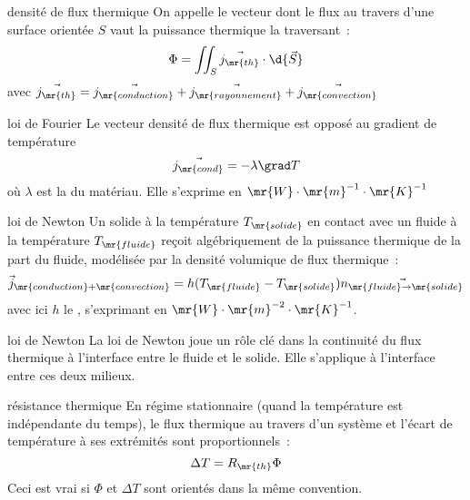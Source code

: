

\begin{adjustwidth}{-3cm}{-3cm}

\setcounter{chapitre}{15}

\begin{definition}{}{densité de flux thermique}
    On appelle  le vecteur dont le flux au travers d'une surface orientée $S$ vaut la puissance thermique la traversant~:
    $$\Phi = \iint_S \vec{j_\mr{th}} \cdot \d{\vec{S}}$$
    avec $\vec{j_\mr{th}} = \vec{j_\mr{conduction}} + \vec{j_\mr{rayonnement}} + \vec{j_\mr{convection}}$
\end{definition}

\begin{theoreme}{}{loi de Fourier}
    Le vecteur densité de flux thermique  est opposé au gradient de température~
    $$\vec{j_\mr{cond}} = -\lambda \grad T$$
    où $\lambda$ est la  du matériau. Elle s'exprime en $\mr{W}\cdot\mr{m}^{-1}\cdot\mr{K}^{-1}$
\end{theoreme}

\begin{theoreme}{}{loi de Newton}
    Un solide à la température $T_\mr{solide}$ en contact avec un fluide à la température $T_\mr{fluide}$ reçoit algébriquement de la puissance thermique de la part du fluide, modélisée par la densité volumique de flux thermique~:
    $$\vec{j}_{\mr{conduction}+\mr{convection}} = h(T_\mr{fluide} - T_\mr{solide}) \vec{n_{\mr{fluide} \to \mr{solide}}}$$
    avec ici $h$ le , s'exprimant en $\mr{W}\cdot \mr{m}^{-2} \cdot \mr{K}^{-1}$.
\end{theoreme}

\begin{remarque}{}{loi de Newton}
    La loi de Newton joue un rôle clé dans la continuité du flux thermique à l’interface entre le fluide et le solide. Elle s'applique à l'interface entre ces deux milieux.
\end{remarque}

\begin{proposition}{}{résistance thermique}
    En régime stationnaire (quand la température est indépendante du temps), le flux thermique au travers d'un système et l'écart de température à ses extrémités sont proportionnels~:
    $$\Delta T = R_\mr{th} \Phi$$
    Ceci est vrai si $\Phi$ et $\Delta T$ sont orientés dans la même convention.
\end{proposition}


\end{adjustwidth}
